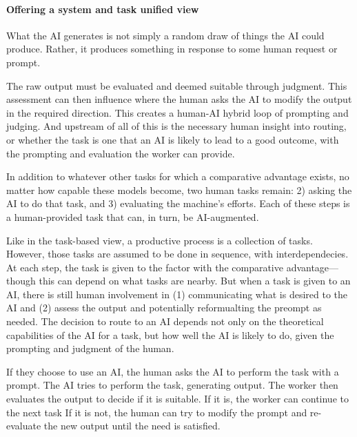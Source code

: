 \documentclass{article}
\begin{document}
\paragraph{Offering a system and task unified view}

What the AI generates is not simply a random draw of things the AI could produce.
Rather, it produces something in response to some human request or prompt.

The raw output must be evaluated and deemed suitable through judgment.
This assessment can then influence where the human asks the AI to modify the output in the required direction. 
This creates a human-AI hybrid loop of prompting and judging. 
And upstream of all of this is the necessary human insight into routing, or whether the task is one that an AI is likely to lead to a good outcome, with the prompting and evaluation the worker can provide. 

In addition to whatever other tasks for which a comparative advantage exists, no matter how capable these models become, two human tasks remain:
2) asking the AI to do that task, and 
3) evaluating the machine's efforts. 
Each of these steps is a human-provided task that can, in turn, be AI-augmented. 

Like in the task-based view, a productive process is a collection of tasks.
However, those tasks are assumed to be done in sequence, with interdependecies.
At each step, the task is given to the factor with the comparative advantage---though this can depend on what tasks are nearby.
But when a task is given to an AI, there is still human involvement in (1) communicating what is desired to the AI and (2) assess the output and potentially reformualting the preompt as needed.
The decision to route to an AI depends not only on the theoretical capabilities of the AI for a task, but how well the AI is likely to do, given the prompting and judgment of the human. 

If they choose to use an AI, the human asks the AI to perform the task with a prompt. 
The AI tries to perform the task, generating output.
The worker then evaluates the output to decide if it is suitable. 
If it is, the worker can continue to the next task 
If it is not, the human can try to modify the prompt and re-evaluate the new output until the need is satisfied. 
\end{document}
